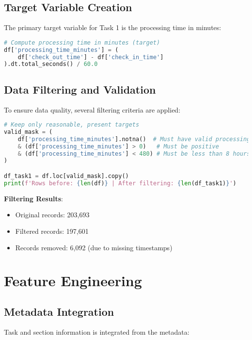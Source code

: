 \documentclass[12pt,a4paper]{article}
\begin{document}
\subsection{Target Variable Creation}

The primary target variable for Task 1 is the processing time in minutes:

\begin{lstlisting}[language=Python, caption=Target Variable Computation]
# Compute processing time in minutes (target)
df['processing_time_minutes'] = (
    df['check_out_time'] - df['check_in_time']
).dt.total_seconds() / 60.0
\end{lstlisting}

\subsection{Data Filtering and Validation}

To ensure data quality, several filtering criteria are applied:

\begin{lstlisting}[language=Python, caption=Data Filtering Logic]
# Keep only reasonable, present targets
valid_mask = (
    df['processing_time_minutes'].notna()  # Must have valid processing time
    & (df['processing_time_minutes'] > 0)   # Must be positive
    & (df['processing_time_minutes'] < 480) # Must be less than 8 hours
)

df_task1 = df.loc[valid_mask].copy()
print(f'Rows before: {len(df)} | After filtering: {len(df_task1)}')
\end{lstlisting}

\textbf{Filtering Results}:
\begin{itemize}
    \item Original records: 203,693
    \item Filtered records: 197,601
    \item Records removed: 6,092 (due to missing timestamps)
\end{itemize}

\section{Feature Engineering}

\subsection{Metadata Integration}

Task and section information is integrated from the metadata:
\end{document}
